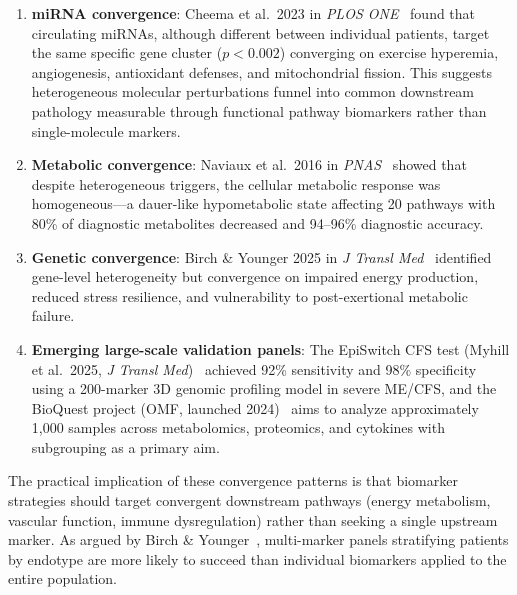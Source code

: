 \begin{enumerate}
    \item \textbf{miRNA convergence}: Cheema et al.\ 2023 in \textit{PLOS ONE}~\cite{Cheema2023mirna} found that circulating miRNAs, although different between individual patients, target the same specific gene cluster ($p < 0.002$) converging on exercise hyperemia, angiogenesis, antioxidant defenses, and mitochondrial fission. This suggests heterogeneous molecular perturbations funnel into common downstream pathology measurable through functional pathway biomarkers rather than single-molecule markers.

    \item \textbf{Metabolic convergence}: Naviaux et al.\ 2016 in \textit{PNAS}~\cite{Naviaux2016metabolic} showed that despite heterogeneous triggers, the cellular metabolic response was homogeneous---a dauer-like hypometabolic state affecting 20 pathways with 80\% of diagnostic metabolites decreased and 94--96\% diagnostic accuracy.

    \item \textbf{Genetic convergence}: Birch \& Younger 2025 in \textit{J Transl Med}~\cite{Birch2025precision} identified gene-level heterogeneity but convergence on impaired energy production, reduced stress resilience, and vulnerability to post-exertional metabolic failure.

    \item \textbf{Emerging large-scale validation panels}: The EpiSwitch CFS test (Myhill et al.\ 2025, \textit{J Transl Med})~\cite{Hunter2025} achieved 92\% sensitivity and 98\% specificity using a 200-marker 3D genomic profiling model in severe ME/CFS, and the BioQuest project (OMF, launched 2024)~\cite{BioQuest2024} aims to analyze approximately 1,000 samples across metabolomics, proteomics, and cytokines with subgrouping as a primary aim.
\end{enumerate}

The practical implication of these convergence patterns is that biomarker strategies should target convergent downstream pathways (energy metabolism, vascular function, immune dysregulation) rather than seeking a single upstream marker. As argued by Birch \& Younger~\cite{Birch2025precision}, multi-marker panels stratifying patients by endotype are more likely to succeed than individual biomarkers applied to the entire population.

